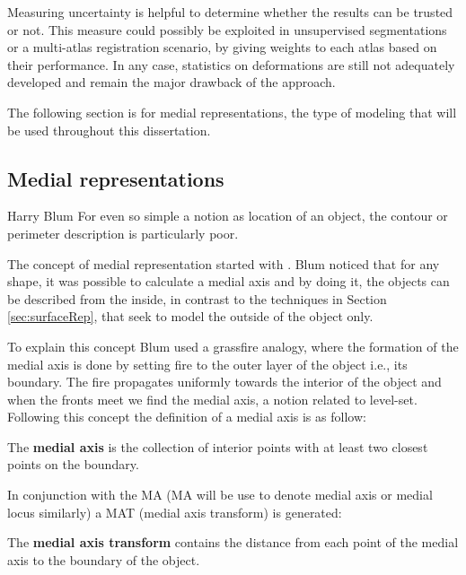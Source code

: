 Measuring uncertainty is helpful to determine whether the results 
can be trusted or not. This measure could possibly be exploited
in unsupervised segmentations or a multi-atlas registration scenario, by giving weights to each atlas based 
on their performance. 
In any case, statistics on deformations are still not adequately developed and remain the major
drawback of the approach. 

The following section is for medial representations, the type of modeling that will be used throughout
this dissertation. 

\subsection{Medial representations}
\label{sec:medialRepresentations}

\begin{chapquote}{Harry Blum}
  For even so simple a notion as location of an object, the contour or perimeter description is particularly poor.
\end{chapquote}

The concept of medial representation started with \cite{blum1967transformation}.
Blum noticed that for any shape, it was possible to calculate a medial axis and 
by doing it, the objects can be described from the inside, in contrast to the techniques 
in Section \ref{sec:surfaceRep}, that seek to model the outside of the object only.

To explain this concept Blum used a grassfire analogy, where the formation of the medial axis is done by setting fire to 
the outer layer of the object i.e., its boundary. The fire propagates uniformly towards the interior of the object and 
when the fronts meet we find the medial axis, a notion related to level-set. 
Following this concept the definition of a medial axis is as follow:

\begin{definition}
 The \textbf{medial axis} is the collection of interior points with at least two closest points on the boundary.
 \label{def:medialAxis}
\end{definition}

In conjunction with the MA (MA will be use to denote medial axis or medial locus similarly) a MAT (medial axis transform) is generated: 

\begin{definition}
 The \textbf{medial axis transform} contains the distance from each point of the medial axis to the boundary of the object. 
\end{definition}


